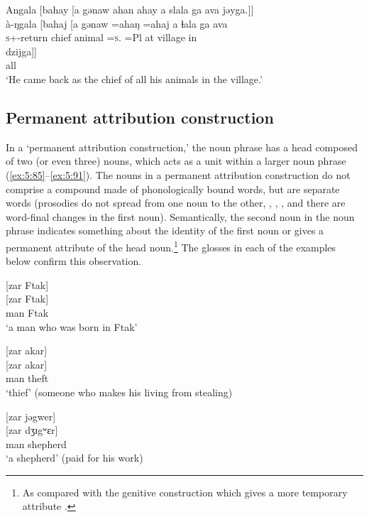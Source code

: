 \ea \label{ex:5:84}
Angala  [bahay  [a  gənaw  ahan  ahay  a  slala  ga  ava  jəyga.]]\\
\gll  à-ŋgala     [bahaj  [a   gənaw  =ahaŋ     =ahaj  a  ɬala  ga  ava\\ 
      \textsc{s}+{\PFV}-return  chief  {\GEN}  animal  =\textsc{s}.{\POSS} =Pl  at  village  {\ADJ}  in\\
      
      \medskip
\gll dzijga]]\\
     all\\
\glt  ‘He came back as the chief of all his animals in the village.’ 
\z

\subsection{Permanent attribution construction}\label{sec:5.4.2}
\hypertarget{RefHeading1211761525720847}{}
In a ‘permanent attribution construction,’ the noun phrase has a head composed of two (or even three) nouns, which acts as a unit within a larger noun phrase (\ref{ex:5:85}--\ref{ex:5:91}). The nouns in a permanent attribution construction do not comprise a compound made of phonologically bound words, but are separate words (prosodies do not spread from one noun to the other, , , , and there are word-final changes in the first noun). Semantically, the second noun in the noun phrase indicates something about the identity of the first noun or gives a permanent attribute of the head noun.\footnote{As compared with the genitive construction which gives a more temporary attribute .} The glosses in each of the examples below confirm this observation. 

\ea \label{ex:5:85}
{}[zar  Ftak]\\
\gll  {}[zar Ftak]\\
      man    Ftak\\
\glt  ‘a man who was born in Ftak’
\z

\ea \label{ex:5:86}
{}[zar  akar]\\
\gll  {}[zar    akar]\\
      man   theft\\
\glt  ‘thief’ (someone who makes his living from stealing)
\z

\ea \label{ex:5:87}
{}[zar  jəgwer]\\
\gll  {}[zar   dʒɪgʷɛr]\\
      man    shepherd\\
\glt  ‘a shepherd’ (paid for his work)
\z

